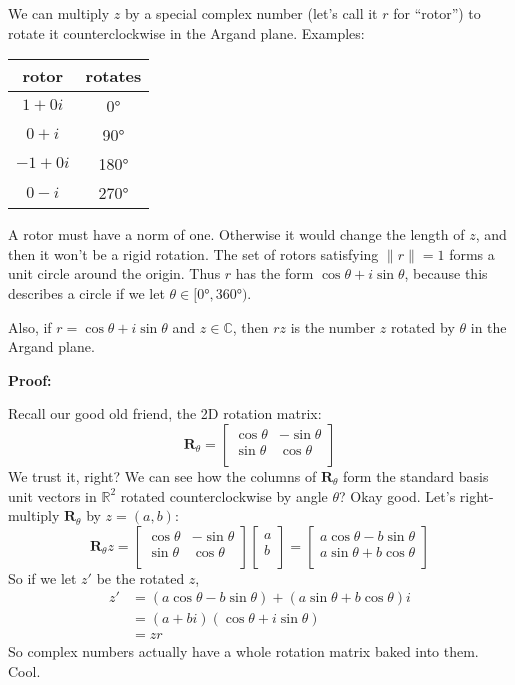 \documentclass[12pt]{article}
\begin{document}
	We can multiply $z$ by a special complex number (let's call it $r$ for ``rotor'') to rotate it counterclockwise in the Argand plane. Examples:
	
	\begin{tabular}{|c|c|}
 		\hline
 		rotor & rotates \\
 		\hline
 		$1 + 0i$ & 0\si{\degree}\\ \hline
 		$0 + i$ & 90\si{\degree}\\ \hline
 		$-1 + 0i$ & 180\si{\degree}\\ \hline
 		$0 - i$ & 270\si{\degree}\\ \hline
	\end{tabular}
	
	A rotor must have a norm of one. 
	Otherwise it would change the length of $z$, and then it won't be a rigid rotation. 
	The set of rotors satisfying $\|r\| = 1$ forms a unit circle around the origin. 
	Thus $r$ has the form $\cos\theta + i\sin\theta$, because this describes a circle if we let $\theta \in [0\si{\degree}, 360\si{\degree})$.
	
	Also, if $r = \cos\theta + i\sin\theta$ and $z \in \mathbb{C}$, then $rz$ is the number $z$ rotated by $\theta$ in the Argand plane.
	
	\textbf{Proof:}
	
	Recall our good old friend, the 2D rotation matrix:	
	$$\mathbf{R}_\theta = \begin{bmatrix}
							\cos\theta & -\sin\theta \\
							\sin\theta & \cos\theta \\
						\end{bmatrix}$$	
	We trust it, right? 
	We can see how the columns of $\mathbf{R}_\theta$ form the standard basis unit vectors in $\mathbb{R}^2$ rotated counterclockwise by angle $\theta$? 
	Okay good. 
	Let's right-multiply $\mathbf{R}_\theta$ by $z = (a, b)$:
	$$\mathbf{R}_\theta z = \begin{bmatrix}
							\cos\theta & -\sin\theta \\
							\sin\theta & \cos\theta \\
						\end{bmatrix}
						\begin{bmatrix}
							a \\
							b \\
						\end{bmatrix} =	
						\begin{bmatrix}
								a\cos\theta - b\sin\theta \\
								a\sin\theta + b\cos\theta \\
							\end{bmatrix}$$
	So if we let $z'$ be the rotated $z$,
	\begin{align*}
	z' &= (a\cos\theta - b\sin\theta) + (a\sin\theta + b\cos\theta)i \\
	   &= (a + bi)(\cos\theta + i\sin\theta) \\
	   &= zr
	\end{align*}	
	So complex numbers actually have a whole rotation matrix baked into them. 
	Cool.
	
\end{document}
